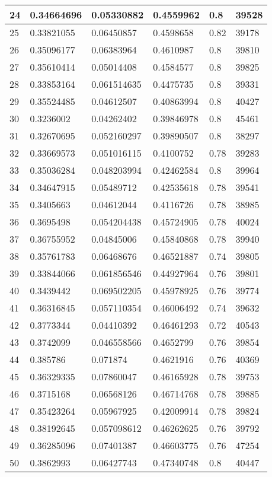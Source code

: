 \begin{longtable}{|l|l|l|l|l|l|}
24 & 0.34664696 & 0.05330882 & 0.4559962 & 0.8 & 39528 \\ \hline 
25 & 0.33821055 & 0.06450857 & 0.4598658 & 0.82 & 39178 \\ \hline 
26 & 0.35096177 & 0.06383964 & 0.4610987 & 0.8 & 39810 \\ \hline 
27 & 0.35610414 & 0.05014408 & 0.4584577 & 0.8 & 39825 \\ \hline 
28 & 0.33853164 & 0.061514635 & 0.4475735 & 0.8 & 39331 \\ \hline 
29 & 0.35524485 & 0.04612507 & 0.40863994 & 0.8 & 40427 \\ \hline 
30 & 0.3236002 & 0.04262402 & 0.39846978 & 0.8 & 45461 \\ \hline 
31 & 0.32670695 & 0.052160297 & 0.39890507 & 0.8 & 38297 \\ \hline 
32 & 0.33669573 & 0.051016115 & 0.4100752 & 0.78 & 39283 \\ \hline 
33 & 0.35036284 & 0.048203994 & 0.42462584 & 0.8 & 39964 \\ \hline 
34 & 0.34647915 & 0.05489712 & 0.42535618 & 0.78 & 39541 \\ \hline 
35 & 0.3405663 & 0.04612044 & 0.4116726 & 0.78 & 38985 \\ \hline 
36 & 0.3695498 & 0.054204438 & 0.45724905 & 0.78 & 40024 \\ \hline 
37 & 0.36755952 & 0.04845006 & 0.45840868 & 0.78 & 39940 \\ \hline 
38 & 0.35761783 & 0.06468676 & 0.46521887 & 0.74 & 39805 \\ \hline 
39 & 0.33844066 & 0.061856546 & 0.44927964 & 0.76 & 39801 \\ \hline 
40 & 0.3439442 & 0.069502205 & 0.45978925 & 0.76 & 39774 \\ \hline 
41 & 0.36316845 & 0.057110354 & 0.46006492 & 0.74 & 39632 \\ \hline 
42 & 0.3773344 & 0.04410392 & 0.46461293 & 0.72 & 40543 \\ \hline 
43 & 0.3742099 & 0.046558566 & 0.4652799 & 0.76 & 39854 \\ \hline 
44 & 0.385786 & 0.071874 & 0.4621916 & 0.76 & 40369 \\ \hline 
45 & 0.36329335 & 0.07860047 & 0.46165928 & 0.78 & 39753 \\ \hline 
46 & 0.3715168 & 0.06568126 & 0.46714768 & 0.78 & 39885 \\ \hline 
47 & 0.35423264 & 0.05967925 & 0.42009914 & 0.78 & 39824 \\ \hline 
48 & 0.38192645 & 0.057098612 & 0.46262625 & 0.76 & 39792 \\ \hline 
49 & 0.36285096 & 0.07401387 & 0.46603775 & 0.76 & 47254 \\ \hline 
50 & 0.3862993 & 0.06427743 & 0.47340748 & 0.8 & 40447 \\ \hline 
\end{longtable}